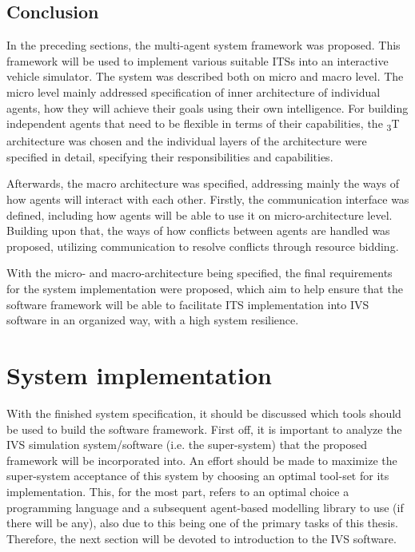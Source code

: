 \documentclass[main.tex]{subfiles}
\begin{document}
\subsection{Conclusion}

In the preceding sections, the multi-agent system framework was proposed. This framework will be used to implement various 
suitable ITSs into an interactive vehicle simulator. The system was described both on micro and macro level. The micro level 
mainly addressed specification of inner architecture of individual agents, how they will achieve their goals using their 
own intelligence. For building independent agents that need to be flexible in terms of their capabilities, the \textsubscript{3}T
architecture was chosen and the individual layers of the architecture were specified in detail, specifying their responsibilities
and capabilities. 

Afterwards, the macro architecture was specified, addressing mainly the ways of how agents will interact with each other. 
Firstly, the communication interface was defined, including how agents will be able to use it on micro-architecture level.
Building upon that, the ways of how conflicts between agents are handled was proposed, utilizing communication to resolve 
conflicts through resource bidding. 

With the micro- and macro-architecture being specified, the final requirements for the system implementation were proposed, 
which aim to help ensure that the software framework will be able to facilitate ITS implementation into IVS software in an 
organized way, with a high system resilience.

\section{System implementation}

With the finished system specification, it should be discussed which tools should be used to build the software framework. 
First off, it is important to analyze the IVS simulation system/software (i.e. the super-system) that
the proposed framework will be incorporated into. An effort should be made to maximize the super-system acceptance of 
this system by choosing an optimal tool-set for its implementation. This, for the most part,
refers to an optimal choice a programming language and a subsequent agent-based modelling
library to use (if there will be any), also due to this being one of the primary tasks of this thesis. 
Therefore, the next section will be devoted to introduction to the IVS software.
\end{document}
